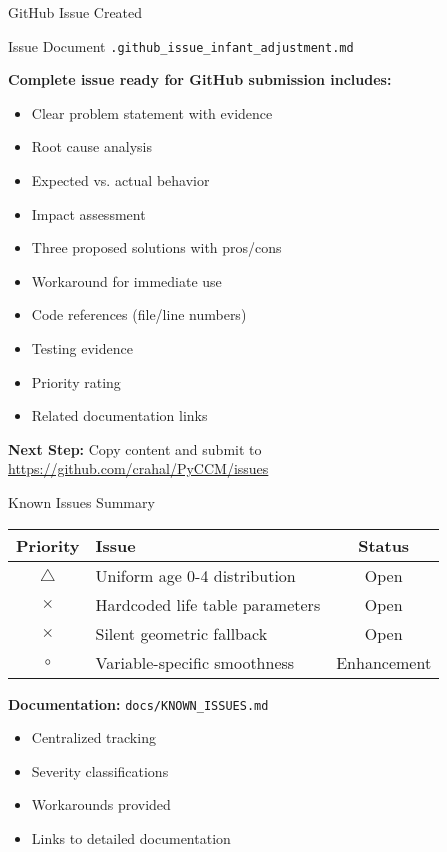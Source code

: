 \documentclass[aspectratio=169]{beamer}
\begin{document}
\begin{frame}{GitHub Issue Created}
\begin{block}{Issue Document}
\texttt{.github\_issue\_infant\_adjustment.md}
\end{block}

\textbf{Complete issue ready for GitHub submission includes:}
\begin{itemize}
    \item Clear problem statement with evidence
    \item Root cause analysis
    \item Expected vs. actual behavior
    \item Impact assessment
    \item Three proposed solutions with pros/cons
    \item Workaround for immediate use
    \item Code references (file/line numbers)
    \item Testing evidence
    \item Priority rating
    \item Related documentation links
\end{itemize}

\vspace{0.2cm}

\textbf{Next Step:} Copy content and submit to \url{https://github.com/crahal/PyCCM/issues}
\end{frame}

\begin{frame}{Known Issues Summary}
\begin{table}
\small
\begin{tabular}{clc}
\toprule
\textbf{Priority} & \textbf{Issue} & \textbf{Status} \\
\midrule
\textcolor{criticalred}{$\triangle$} & Uniform age 0-4 distribution & Open \\
\textcolor{warningorange}{$\times$} & Hardcoded life table parameters & Open \\
\textcolor{warningorange}{$\times$} & Silent geometric fallback & Open \\
\textcolor{codeblue}{$\circ$} & Variable-specific smoothness & Enhancement \\
\bottomrule
\end{tabular}
\end{table}

\vspace{0.3cm}

\textbf{Documentation:} \texttt{docs/KNOWN\_ISSUES.md}
\begin{itemize}
    \item Centralized tracking
    \item Severity classifications
    \item Workarounds provided
    \item Links to detailed documentation
\end{itemize}
\end{frame}
\end{document}
